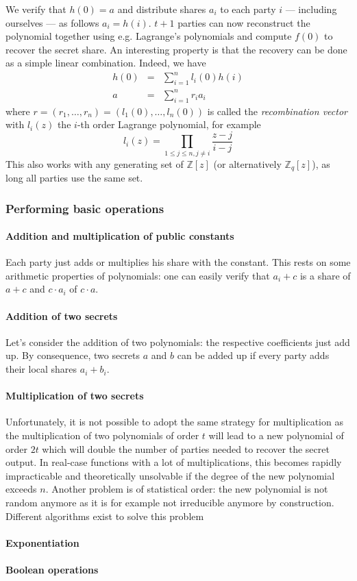 We verify that $h(0)=a$ and distribute shares $a_i$ to each party $i$ --- including ourselves --- as follows $a_i=h(i)$. $t+1$ parties can now reconstruct the polynomial together using e.g. Lagrange's polynomials and compute $f(0)$ to recover the secret share. An interesting property is that the recovery can be done as a simple linear combination. Indeed, we have
\begin{eqnarray*}
    h(0) &=& \sum_{i=1}^{n} l_i(0)h(i) \\
    a &=& \sum_{i=1}^{n} r_ia_i
\end{eqnarray*}
where $r = \left(r_1, \ldots , r_n\right) = \left(l_1(0), \ldots , l_n(0)\right)$ is called the \emph{recombination vector} with $l_i(z)$ the $i$-th order Lagrange polynomial, for example
\begin{equation*}
    l_i(z) = \prod_{1\leq j \leq n,j\neq i}\frac{z-j}{i-j}
\end{equation*}
This also works with any generating set of $\mathbb{Z}\left[z\right]$ (or alternatively $\mathbb{Z}_q\left[z\right]$), as long all parties use the same set.

\subsubsection{Performing basic operations}

\paragraph{Addition and multiplication of public constants}
Each party just adds or multiplies his share with the constant. This rests on some arithmetic properties of polynomials: one can easily verify that $a_i+c$ is a share of $a+c$ and $c \cdot a_i$ of $c \cdot a$.

\paragraph{Addition of two secrets}
Let's consider the addition of two polynomials: the respective coefficients just add up. By consequence, two secrets $a$ and $b$ can be added up if every party adds their local shares $a_i+b_i$.


\paragraph{Multiplication of two secrets}
Unfortunately, it is not possible to adopt the same strategy for multiplication as the multiplication of two polynomials of order $t$ will lead to a new polynomial of order $2t$ which will double the number of parties needed to recover the secret output. In real-case functions with a lot of multiplications, this becomes rapidly impracticable and theoretically unsolvable if the degree of the new polynomial exceeds $n$. Another problem is of statistical order: the new polynomial is not random anymore as it is for example not irreducible anymore by construction. Different algorithms exist to solve this problem 

\paragraph{Exponentiation}


\paragraph{Boolean operations}